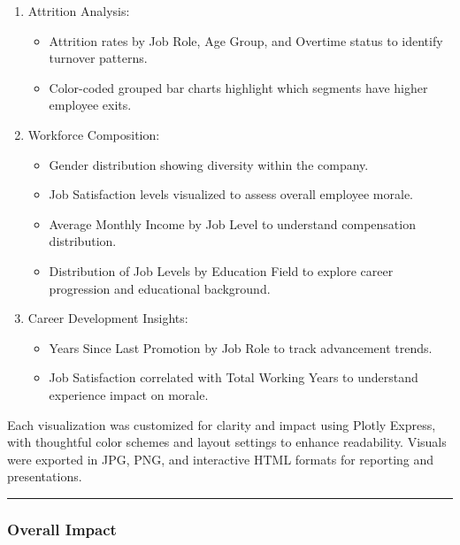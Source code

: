\documentclass[
  letterpaper,
  DIV=11,
  numbers=noendperiod]{scrartcl}
\providecommand{\tightlist}{%
  \setlength{\itemsep}{0pt}\setlength{\parskip}{0pt}}
\begin{document}
\begin{enumerate}
\def\labelenumi{\arabic{enumi}.}
\tightlist
\item
  Attrition Analysis:

  \begin{itemize}
  \tightlist
  \item
    Attrition rates by Job Role, Age Group, and Overtime status to
    identify turnover patterns.
  \item
    Color-coded grouped bar charts highlight which segments have higher
    employee exits.
  \end{itemize}
\item
  Workforce Composition:

  \begin{itemize}
  \tightlist
  \item
    Gender distribution showing diversity within the company.
  \item
    Job Satisfaction levels visualized to assess overall employee
    morale.
  \item
    Average Monthly Income by Job Level to understand compensation
    distribution.
  \item
    Distribution of Job Levels by Education Field to explore career
    progression and educational background.
  \end{itemize}
\item
  Career Development Insights:

  \begin{itemize}
  \tightlist
  \item
    Years Since Last Promotion by Job Role to track advancement trends.
  \item
    Job Satisfaction correlated with Total Working Years to understand
    experience impact on morale.
  \end{itemize}
\end{enumerate}

Each visualization was customized for clarity and impact using Plotly
Express, with thoughtful color schemes and layout settings to enhance
readability. Visuals were exported in JPG, PNG, and interactive HTML
formats for reporting and presentations.

\begin{center}\rule{0.5\linewidth}{0.5pt}\end{center}

\subsubsection{Overall Impact}\label{overall-impact}
\end{document}
